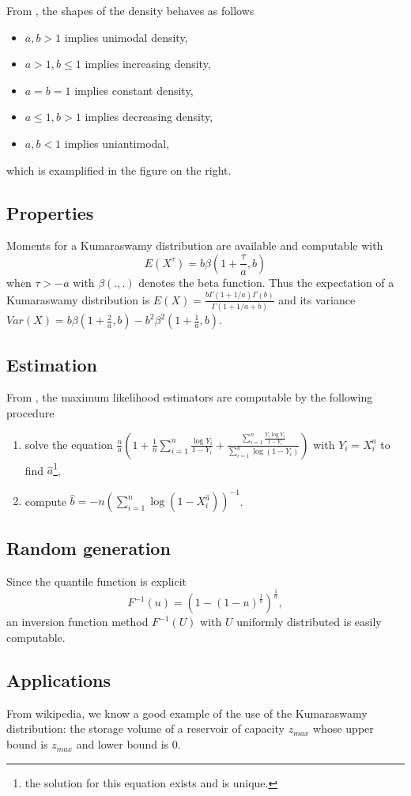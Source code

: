 From \cite{jones}, the shapes of the density behaves as follows
\begin{itemize}
\item $a,b>1$ implies unimodal density,
\item $a>1, b\leq 1$ implies increasing density,
\item $a=b=1$ implies constant density,
\item $a\leq 1, b >1$ implies decreasing density,
\item $a,b<1$ implies uniantimodal,
\end{itemize}
which is examplified in the figure on the right.

\subsection{Properties}
Moments for a Kumaraswamy distribution are available and computable with
$$
E(X^\tau )= b\beta(1+\frac{\tau}{a},b)
$$
when $\tau > -a$ with $\beta(.,.)$ denotes the beta function. Thus the expectation of a Kumaraswamy distribution is $E(X)=\frac{b\Gamma(1+1/a)\Gamma(b)}{\Gamma(1+1/a+b)}$ and its variance $Var(X) = b\beta(1+\frac{2}{a},b) - b^2\beta^2(1+\frac{1}{a},b)$.

\subsection{Estimation}
From \cite{jones}, the maximum likelihood estimators are computable by the following procedure
\begin{enumerate}
\item solve the equation $\frac{n}{a}\left(1+\frac{1}{n}\sum_{i=1}^n \frac{\log Y_i}{1-Y_i} + \frac{ \sum_{i=1}^n \frac{Y_i\log Y_i}{1-Y_i} }{ \sum_{i=1}^n \log(1- Y_i) } \right)$ with $Y_i=X_i^a$ to find $\hat a$\footnote{the solution for this equation exists and is unique.},
\item compute $\hat b = -n\left( \sum_{i=1}^n \log(1- X_i^{\hat a}) \right)^{-1}$.
\end{enumerate}

\subsection{Random generation}
Since the quantile function is explicit
$$
F^{-1}(u) = \left(1-\left(1-u\right)^{\frac{1}{b}} \right)^{\frac{1}{a}},
$$
an inversion function method $F^{-1}(U)$ with $U$ uniformly distributed is easily computable.


\subsection{Applications}
From wikipedia, we know a good example of the use of the Kumaraswamy distribution: the storage volume of a reservoir of capacity $z_{max}$ whose upper bound is $z_{max}$ and lower bound is 0.

